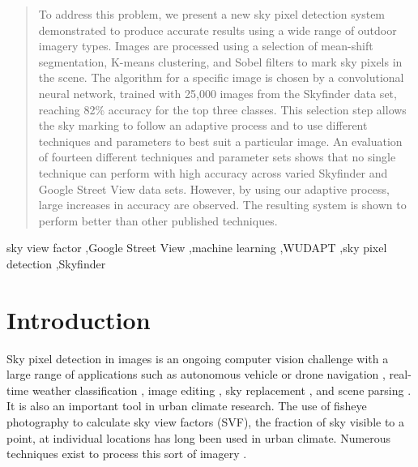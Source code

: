 \documentclass[final,3p,times,authoryear]{elsarticle}
\begin{document}
\begin{frontmatter}
\begin{abstract}
To address this problem, we present a new sky pixel detection system demonstrated to produce accurate results using a wide range of outdoor imagery types. Images are processed using a selection of mean-shift segmentation, K-means clustering, and Sobel filters to mark sky pixels in the scene. The algorithm for a specific image is chosen by a convolutional neural network, trained with 25,000 images from the Skyfinder data set, reaching 82\% accuracy for the top three classes. This selection step allows the sky marking to follow an adaptive process and to use different techniques and parameters to best suit a particular image. An evaluation of fourteen different techniques and parameter sets shows that no single technique can perform with high accuracy across varied Skyfinder and Google Street View data sets. However, by using our adaptive process, large increases in accuracy are observed. The resulting system is shown to perform better than other published techniques.



\end{abstract}

\begin{keyword}
sky view factor \sep Google Street View \sep machine learning \sep WUDAPT \sep sky pixel detection \sep Skyfinder



\end{keyword}

\end{frontmatter}

\section{Introduction}\label{sec:introduction}
Sky pixel detection in images is an ongoing computer vision challenge with a large range of applications such as autonomous vehicle or drone navigation \citep{Shen2013}, real-time weather classification \citep{Roser2008}, image editing \citep{Laffont2014,Tao2009}, sky replacement \citep{Tsai2016}, and scene parsing \citep{Tighe2010,Hoiem2005}. It is also an important tool in urban climate research. The use of fisheye photography to calculate sky view factors (SVF), the fraction of sky visible to a point, at individual locations has long been used in urban climate. Numerous techniques exist to process this sort of imagery \citep{Grimmond2001,Chapman2004,Ali-Toudert2007}.
\end{document}
